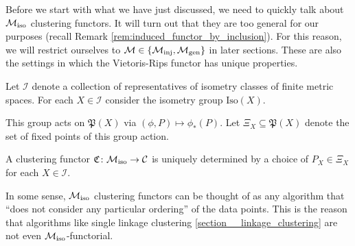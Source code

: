 

Before we start with what we have just discussed, we need to quickly talk about ${\mathcal{M}_\mathrm{iso}}$ clustering functors.
It will turn out that they are too general for our purposes (recall Remark \ref{rem:induced_functor_by_inclusion}).
For this reason, we will restrict ourselves to $\mathcal{M} \in \{{\mathcal{M}_\mathrm{inj}}, {\mathcal{M}_\mathrm{gen}}\}$ in later sections. These are also the settings in which the Vietoris-Rips functor has unique properties.

\begin{myremark}{\cite[Thm.~6.1]{Carlsson2010}}{}
Let $\mathcal{I}$ denote a collection of representatives of isometry classes of finite metric spaces.
For each $X \in \mathcal{I}$ consider the isometry group $\mathrm{Iso}(X)$. \par

\medskip This group acts on $\mathfrak{P}(X)$ via $(\phi, P) \mapsto \phi_*(P)$.
Let $\Xi_X \subseteq \mathfrak{P}(X)$ denote the set of fixed points of this group action. \par

\medskip A clustering functor $\mathfrak{C}\colon {\mathcal{M}_\mathrm{iso}} \to \mathcal{C}$ is uniquely determined by a choice of $P_X \in \Xi_X$ for each $X \in \mathcal{I}$.
\end{myremark}


In some sense, ${\mathcal{M}_\mathrm{iso}}$ clustering functors can be thought of as any algorithm that ``does not consider any particular ordering'' of the data points.
This is the reason that algorithms like single linkage clustering \ref{section__linkage_clustering} are not even ${\mathcal{M}_\mathrm{iso}}$-functorial.

